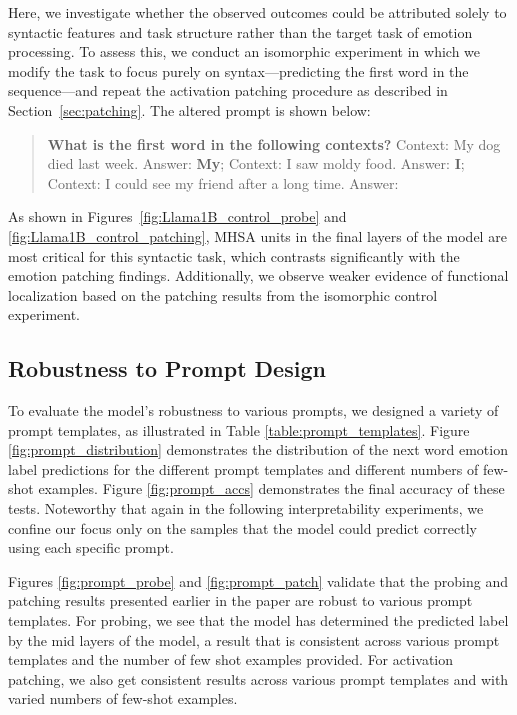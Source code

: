 Here, we investigate whether the observed outcomes could be attributed solely to syntactic features and task structure rather than the target task of emotion processing. To assess this, we conduct an isomorphic experiment in which we modify the task to focus purely on syntax—predicting the first word in the sequence—and repeat the activation patching procedure as described in Section~\ref{sec:patching}. The altered prompt is shown below:

\begin{quote}
\textbf{What is the first word in the following contexts?}  
Context: My dog died last week. Answer: \textbf{My};   
Context: I saw moldy food. Answer: \textbf{I};   
Context: I could see my friend after a long time. Answer:
\end{quote}

As shown in Figures~\ref{fig:Llama1B_control_probe} and \ref{fig:Llama1B_control_patching}, MHSA units in the final layers of the model are most critical for this syntactic task, which contrasts significantly with the emotion patching findings. Additionally, we observe weaker evidence of functional localization based on the patching results from the isomorphic control experiment.


\subsection{Robustness to Prompt Design} \label{app:prompt}

To evaluate the model's robustness to various prompts, we designed a variety of prompt templates, as illustrated in Table \ref{table:prompt_templates}.
Figure \ref{fig:prompt_distribution} demonstrates the distribution of the next word emotion label predictions for the different prompt templates and different numbers of few-shot examples. Figure \ref{fig:prompt_accs} demonstrates the final accuracy of these tests. Noteworthy that again in the following interpretability experiments, we confine our focus only on the samples that the model could predict correctly using each specific prompt.

Figures \ref{fig:prompt_probe} and \ref{fig:prompt_patch} validate that the probing and patching results presented earlier in the paper are robust to various prompt templates. For probing, we see that the model has determined the predicted label by the mid layers of the model, a result that is consistent across various prompt templates and the number of few shot examples provided. For activation patching, we also get consistent results across various prompt templates and with varied numbers of few-shot examples. 


